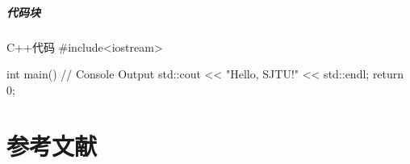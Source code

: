 \documentclass[
    aspectratio=169,  %
]{ctexbeamer}
\begin{document}
\begin{frame}[fragile]          %
  \frametitle{代码块}
  \begin{codeblock}[language=c++]{C++代码}
#include<iostream>

int main(){
  // Console Output
  std::cout << "Hello, SJTU!" << std::endl;
  return 0;
}
  \end{codeblock}
\end{frame}

\part{参考文献}
\begin{frame}[allowframebreaks]
  \printbibliography[heading=none]
\end{frame}

\makebottom       %
\end{document}
